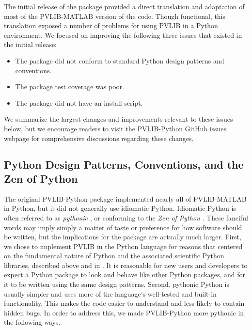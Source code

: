 \documentclass[conference]{IEEEtran}
\begin{document}
The initial release of the package provided a direct translation and adaptation of most of the PVLIB-MATLAB version of the code.
Though functional, this translation exposed a number of problems for using PVLIB in a Python environment.
We focused on improving the following three issues that existed in the initial release:

\begin{itemize}
\item The package did not conform to standard Python design patterns and conventions.
\item The package test coverage was poor. 
\item The package did not have an install script.
\end{itemize}

We summarize the largest changes and improvements relevant to these issues below, but we encourage readers to visit the PVLIB-Python GitHub issues webpage for comprehensive discussions regarding these changes.


\subsection{Python Design Patterns, Conventions, and the Zen of Python}

The original PVLIB-Python package implemented nearly all of PVLIB-MATLAB in Python, but it did not generally use idiomatic Python.
Idiomatic Python is often referred to as \emph{pythonic} \cite{pythonic}, or conforming to the \emph{Zen of Python} \cite{zenofpython}. 
These fanciful words may imply simply a matter of taste or preference for how software should be written, but the implications for the package are actually much larger.
First, we chose to implement PVLIB in the Python language for reasons that centered on the fundamental nature of Python and the associated scientific Python libraries, described above and in \cite{andrews}. 
It is reasonable for new users and developers to expect a Python package to look and behave like other Python packages, and for it to be written using the same design patterns.
Second, pythonic Python is usually simpler and uses more of the language's well-tested and built-in functionality.
This makes the code easier to understand and less likely to contain hidden bugs.
In order to address this, we made PVLIB-Python more pythonic in the following ways.
\end{document}
